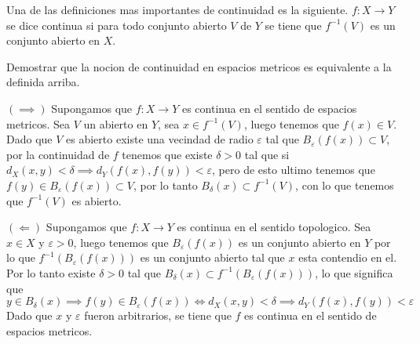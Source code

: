 \documentclass[../main.tex]{subfiles}
\begin{document}
\begin{problem}
  Una de las definiciones mas importantes de continuidad es la siguiente.
  $f: X \to Y$ se dice continua si para todo conjunto abierto $V$ de $Y$ se tiene que $f^{-1}(V)$ es un conjunto abierto en $X$.

  Demostrar que la nocion de continuidad en espacios metricos es equivalente a la definida arriba.
\end{problem}
\begin{solution}
  $(\implies)$ Supongamos que $f : X \to Y$ es continua en el sentido de espacios metricos. Sea $V$ un abierto en $Y$, sea $x \in f^{-1}(V)$, luego tenemos que $f(x) \in V$. Dado que $V$ es abierto existe una vecindad de radio $\varepsilon$ tal que $B_{\varepsilon}(f(x)) \subset V$, por la continuidad de $f$ tenemos que existe $\delta > 0$ tal que si $d_{X}(x, y) < \delta \implies d_{Y}(f(x), f(y)) < \varepsilon$, pero de esto ultimo tenemos que $f(y) \in B_{\varepsilon}(f(x)) \subset V$, por lo tanto $B_{\delta}(x) \subset f^{-1}(V)$, con lo que tenemos que $f^{-1}(V)$ es abierto.

  $(\Longleftarrow)$ Supongamos que $f: X \to Y$ es continua en el sentido topologico. Sea $x \in X$ y $\varepsilon > 0$, luego tenemos que $B_{\varepsilon}(f(x))$ es un conjunto abierto en $Y$ por lo que $f^{-1}(B_{\varepsilon}(f(x)))$ es un conjunto abierto tal que $x$ esta contendio en el. Por lo tanto existe $\delta > 0$ tal que $B_{\delta}(x) \subset f^{-1}(B_{\varepsilon}(f(x)))$, lo que significa que
  \begin{equation*}
    y \in B_{\delta}(x) \implies f(y) \in B_{\varepsilon}(f(x)) \iff d_{X}(x, y) < \delta \implies d_{Y}(f(x), f(y)) < \varepsilon
  \end{equation*}
  Dado que $x$ y $\varepsilon$ fueron arbitrarios, se tiene que $f$ es continua en el sentido de espacios metricos.
\end{solution}
\end{document}
